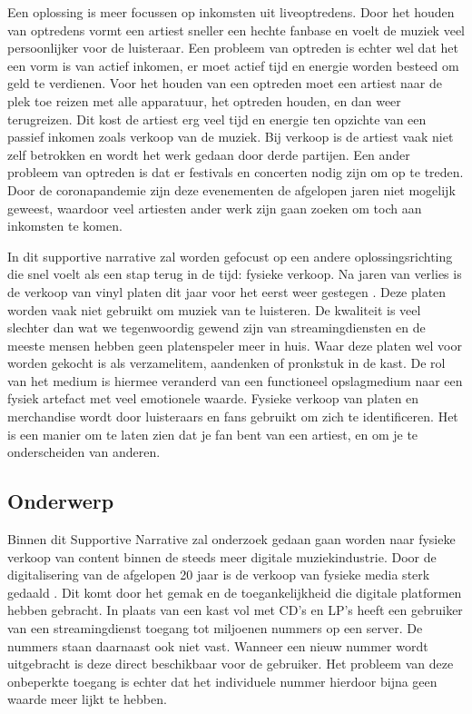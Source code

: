 Een oplossing is meer focussen op inkomsten uit liveoptredens. Door het houden van optredens vormt een artiest sneller een hechte fanbase en voelt de muziek veel persoonlijker voor de luisteraar. Een probleem van optreden is echter wel dat het een vorm is van actief inkomen, er moet actief tijd en energie worden besteed om geld te verdienen. Voor het houden van een optreden moet een artiest naar de plek toe reizen met alle apparatuur, het optreden houden, en dan weer terugreizen. Dit kost de artiest erg veel tijd en energie ten opzichte van een passief inkomen zoals verkoop van de muziek. Bij verkoop is de artiest vaak niet zelf betrokken en wordt het werk gedaan door derde partijen. Een ander probleem van optreden is dat er festivals en concerten nodig zijn om op te treden. Door de coronapandemie zijn deze evenementen de afgelopen jaren niet mogelijk geweest, waardoor veel artiesten ander werk zijn gaan zoeken om toch aan inkomsten te komen.

In dit supportive narrative zal worden gefocust op een andere oplossingsrichting die snel voelt als een stap terug in de tijd: fysieke verkoop. Na jaren van verlies is de verkoop van vinyl platen dit jaar voor het eerst weer gestegen \citep{year_end_2022_RIAA_revenue_statistics}. Deze platen worden vaak niet gebruikt om muziek van te luisteren. De kwaliteit is veel slechter dan wat we tegenwoordig gewend zijn van streamingdiensten en de meeste mensen hebben geen platenspeler meer in huis. Waar deze platen wel voor worden gekocht is als verzamelitem, aandenken of pronkstuk in de kast. De rol van het medium is hiermee veranderd van een functioneel opslagmedium naar een fysiek artefact met veel emotionele waarde. Fysieke verkoop van platen en merchandise wordt door luisteraars en fans gebruikt om zich te identificeren. Het is een manier om te laten zien dat je fan bent van een artiest, en om je te onderscheiden van anderen.

\subsection{Onderwerp}
Binnen dit Supportive Narrative zal onderzoek gedaan gaan worden naar fysieke verkoop van content binnen de steeds meer digitale muziekindustrie. Door de digitalisering van de afgelopen 20 jaar is de verkoop van fysieke media sterk gedaald \citep{dong2022valueofmusic}. Dit komt door het gemak en de toegankelijkheid die digitale platformen hebben gebracht. In plaats van een kast vol met CD's en LP's heeft een gebruiker van een streamingdienst toegang tot miljoenen nummers op een server. De nummers staan daarnaast ook niet vast. Wanneer een nieuw nummer wordt uitgebracht is deze direct beschikbaar voor de gebruiker. Het probleem van deze onbeperkte toegang is echter dat het individuele nummer hierdoor bijna geen waarde meer lijkt te hebben.

